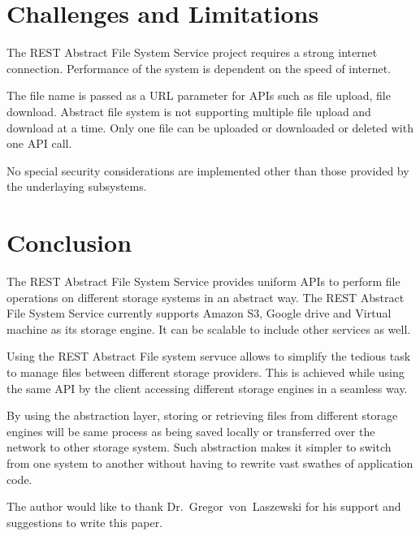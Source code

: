\section{Challenges and Limitations}

The REST Abstract File System Service project requires a strong
internet connection.  Performance of the system is dependent on the
speed of internet.

The file name is passed as a URL parameter for APIs such as file upload,
file download. Abstract file system is not supporting multiple file 
upload and download at a time. Only one file can be uploaded or 
downloaded or deleted with one API call. 

No special security considerations are implemented other than those provided
by the underlaying subsystems.

\section{Conclusion}

The REST Abstract File System Service provides uniform APIs to perform
file operations on different storage systems in an abstract way. The
REST Abstract File System Service currently supports Amazon S3, Google
drive and Virtual machine as its storage engine. It can be scalable to
include other services as well.


Using the REST Abstract File system servuce allows to simplify the
tedious task to manage files between different storage providers. This
is achieved while using the same API by the client accessing different
storage engines in a seamless way.


By using the abstraction layer, storing or retrieving files from
different storage engines will be same process as being saved locally
or transferred over the network to other storage system. Such
abstraction makes it simpler to switch from one system to another
without having to rewrite vast swathes of application code.



\begin{acks}

  The author would like to thank Dr.~Gregor~von~Laszewski for his
  support and suggestions to write this paper.

\end{acks}


 

